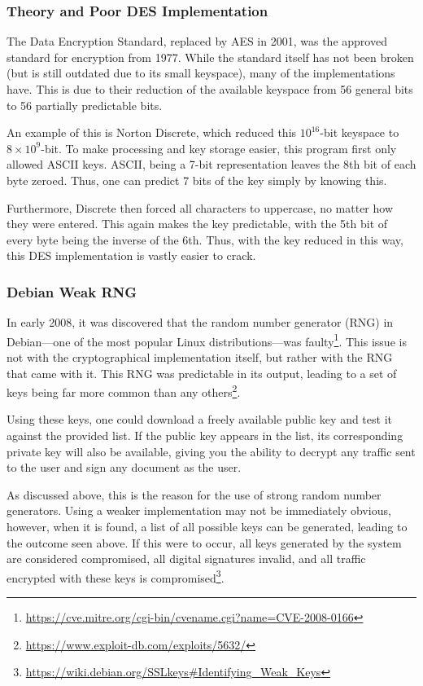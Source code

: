			\subsubsection{Theory and Poor DES Implementation}
				The Data Encryption Standard, replaced by AES in 2001, was the approved standard for encryption from 1977.
				While the standard itself has not been broken (but is still outdated due to its small keyspace),
				many of the implementations have.
				This is due to their reduction of the available keyspace from 56 general bits to 56 partially predictable bits.

				An example of this is Norton Discrete, which reduced this $10^{16}$-bit keyspace to $8\times10^9$-bit.
				To make processing and key storage easier, this program first only allowed ASCII keys.
				ASCII, being a 7-bit representation leaves the 8th bit of each byte zeroed.
				Thus, one can predict 7 bits of the key simply by knowing this.

				Furthermore, Discrete then forced all characters to uppercase, no matter how they were entered.
				This again makes the key predictable, with the 5th bit of every byte being the inverse of the 6th.
				Thus, with the key reduced in this way, this DES implementation is vastly easier to crack.

			\subsubsection{Debian Weak RNG}
				In early 2008, it was discovered that the random number generator (RNG) in Debian---one of the most popular Linux distributions---was faulty\footnote{\url{https://cve.mitre.org/cgi-bin/cvename.cgi?name=CVE-2008-0166}}.
				This issue is not with the cryptographical implementation itself, but rather with the RNG that came with it.
				This RNG was predictable in its output, leading to a set of keys being far more common than any others\footnote{\url{https://www.exploit-db.com/exploits/5632/}}.

				Using these keys, one could download a freely available public key and test it against the provided list.
				If the public key appears in the list, its corresponding private key will also be available, giving you the ability to decrypt any traffic sent to the user and sign any document as the user.

				As discussed above, this is the reason for the use of strong random number generators.
				Using a weaker implementation may not be immediately obvious,
				however, when it is found, a list of all possible keys can be generated, leading to the outcome seen above.
				If this were to occur, all keys generated by the system are considered compromised, all digital signatures invalid, and all traffic encrypted with these keys is compromised\footnote{\url{https://wiki.debian.org/SSLkeys\#Identifying\_Weak\_Keys}}.
